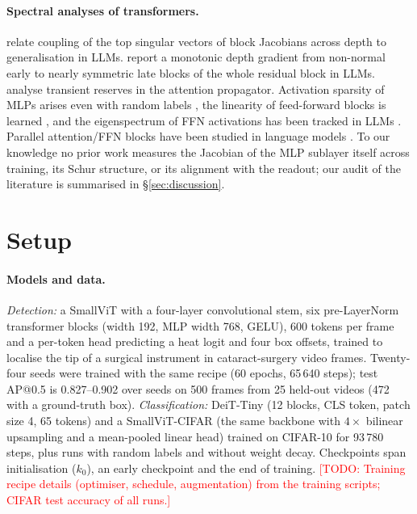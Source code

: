 \documentclass[10pt]{article}
\newcommand{\todo}[1]{\textcolor{red}{[TODO: #1]}}
\begin{document}
\paragraph{Spectral analyses of transformers.} \citet{aubry2025transformer} relate coupling of the top singular vectors of block Jacobians
across depth to generalisation in LLMs. \citet{fernando2026dynamics} report a monotonic depth gradient from non-normal early to nearly
symmetric late blocks of the whole residual block in LLMs. \citet{li2026transient} analyse transient reserves in the attention
propagator. Activation sparsity of MLPs arises even with random labels \citep{li2023lazy}, the linearity of feed-forward blocks is learned
\citep{whipp2026linear}, and the eigenspectrum of FFN activations has been tracked in LLMs \citep{jha2026nerve}. Parallel attention/FFN
blocks have been studied in language models \citep{sonkar2023investigating}. To our knowledge no prior work measures the Jacobian of the
MLP sublayer itself across training, its Schur structure, or its alignment with the readout; our audit of the literature is summarised in
\S\ref{sec:discussion}.

\section{Setup}
\label{sec:setup}

\paragraph{Models and data.} \emph{Detection:} a SmallViT with a four-layer convolutional stem, six pre-LayerNorm transformer blocks
(width 192, MLP width 768, GELU), 600 tokens per frame and a per-token head predicting a heat logit and four box offsets, trained to
localise the tip of a surgical instrument in cataract-surgery video frames. Twenty-four seeds were trained with the same recipe
(60 epochs, 65\,640 steps); test AP@0.5 is 0.827--0.902 over seeds on 500 frames from 25 held-out videos (472 with a ground-truth box).
\emph{Classification:} DeiT-Tiny \citep{touvron2021training} (12 blocks, CLS token, patch size 4, 65 tokens) and a SmallViT-CIFAR (the same
backbone with $4\times$ bilinear upsampling and a mean-pooled linear head) trained on CIFAR-10 for 93\,780 steps, plus runs with random
labels and without weight decay. Checkpoints span initialisation ($k_0$), an early checkpoint and the end of training.
\todo{Training recipe details (optimiser, schedule, augmentation) from the training scripts; CIFAR test accuracy of all runs.}
\end{document}
